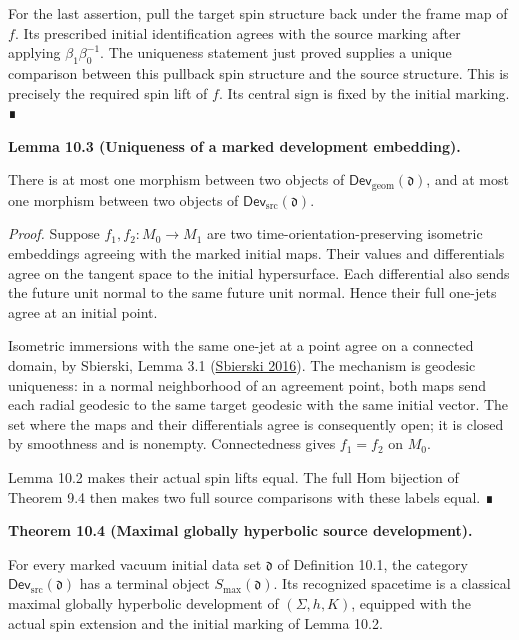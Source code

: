 \documentclass[
  english,
  11pt,
  reqno]{amsart}
\makeatletter
\newcounter{none} %
\newcommand{\pandocstatementheading}[1]{%
  \par\if@nobreak\else
    \addpenalty{\@beginparpenalty}%
    \addvspace{.5\baselineskip plus .2\baselineskip minus .2\baselineskip}%
  \fi
  {\normalfont\bfseries #1\par}%
  \nobreak\@afterindenttrue\@afterheading
}
\makeatother
\begin{document}
For the last assertion, pull the target spin structure back under the
frame map of \(f\). Its prescribed initial identification agrees with
the source marking after applying \(\beta_1\beta_0^{-1}\). The
uniqueness statement just proved supplies a unique comparison between
this pullback spin structure and the source structure. This is precisely
the required spin lift of \(f\). Its central sign is fixed by the
initial marking. ∎

\pandocstatementheading{\protect{}\label{lem:global-marked-development-uniqueness}Lemma 10.3 (Uniqueness of a marked development embedding).}

There is at most one morphism between two objects of
\(\mathsf{Dev}_{\mathrm{geom}}(\mathfrak d)\), and at most one morphism
between two objects of \(\mathsf{Dev}_{\mathrm{src}}(\mathfrak d)\).

\emph{Proof.} Suppose \(f_1,f_2:M_0\to M_1\) are two
time-orientation-preserving isometric embeddings agreeing with the
marked initial maps. Their values and differentials agree on the tangent
space to the initial hypersurface. Each differential also sends the
future unit normal to the same future unit normal. Hence their full
one-jets agree at an initial point.

Isometric immersions with the same one-jet at a point agree on a
connected domain, by Sbierski, Lemma 3.1
(\hyperref[ref-Sbierski2016]{Sbierski 2016}). The mechanism is geodesic
uniqueness: in a normal neighborhood of an agreement point, both maps
send each radial geodesic to the same target geodesic with the same
initial vector. The set where the maps and their differentials agree is
consequently open; it is closed by smoothness and is nonempty.
Connectedness gives \(f_1=f_2\) on \(M_0\).

Lemma 10.2 makes their actual spin lifts equal. The full Hom bijection
of Theorem 9.4 then makes two full source comparisons with these labels
equal. ∎

\pandocstatementheading{\protect{}\label{thm:global-maximal-source-development}Theorem 10.4 (Maximal globally hyperbolic source development).}

For every marked vacuum initial data set \(\mathfrak d\) of Definition
10.1, the category \(\mathsf{Dev}_{\mathrm{src}}(\mathfrak d)\) has a
terminal object \(S_{\max}(\mathfrak d)\). Its recognized spacetime is a
classical maximal globally hyperbolic development of \((\Sigma,h,K)\),
equipped with the actual spin extension and the initial marking of Lemma
10.2.
\end{document}
